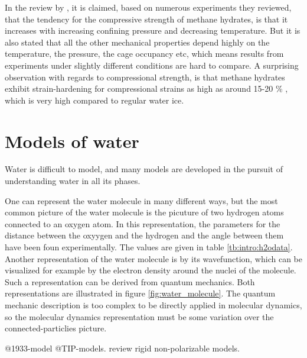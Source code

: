 In the review by \citet{Ning2012}, it is claimed, based on numerous experiments they reviewed, that the tendency for the compressive strength of methane hydrates, is that it increases with increasing confining pressure and decreasing temperature. But it is also stated that all the other mechanical properties depend highly on the temperature, the pressure, the cage occupancy etc, which means results from experiments under slightly different conditions are hard to compare. A surprising observation with regards to compressional strength, is that methane hydrates exhibit strain-hardening for compressional strains as high as around 15-20 \% \cite{Durham2003, Stern1998}, which is very high compared to regular water ice.

\section{Models of water}
Water is difficult to model, and many models are developed in the pursuit of understanding water in all its phases. 

One can represent the water molecule in many different ways, but the most common picture of the water molecule is the picuture of two hydrogen atoms connected to an oxygen atom. In this representation, the parameters for the distance between the oxyygen and the hydrogen and the angle between them have been foun experimentally. The values are given in table \ref{tb:intro:h2odata}. Another representation of the water molecule is by its wavefunction, which can be visualized for example by the electron density around the nuclei of the molecule. Such a representation can be derived from quantum mechanics. Both representations are illustrated in figure \ref{fig:water_molecule}. The quantum mechanic description is too complex to be directly applied in molecular dynamics, so the molecular dynamics representation must be some variation over the connected-particlies picture. 


@1933-model @TIP-models.  \citet{Vega2011} review rigid non-polarizable models.

